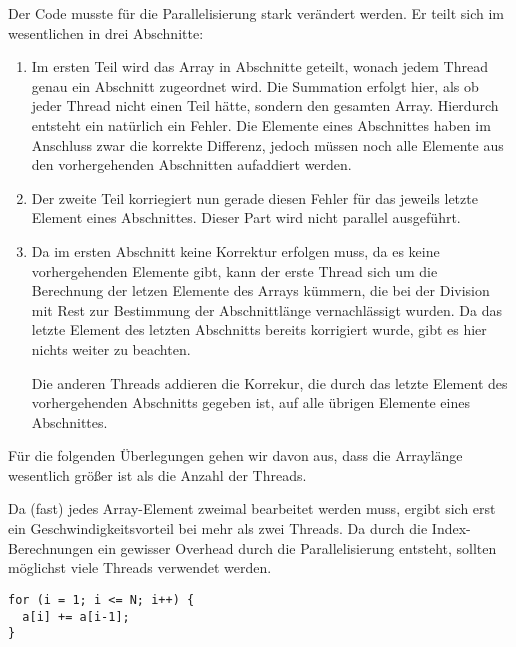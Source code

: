 Der Code musste für die Parallelisierung stark verändert werden. Er teilt sich
im wesentlichen in drei Abschnitte:
\begin{enumerate}
 \item Im ersten Teil wird das Array in Abschnitte geteilt, wonach jedem Thread
       genau ein Abschnitt zugeordnet wird. Die Summation erfolgt hier, als ob
       jeder Thread nicht einen Teil hätte, sondern den gesamten Array. Hierdurch
       entsteht ein natürlich ein Fehler. Die Elemente eines Abschnittes haben im
       Anschluss zwar die korrekte Differenz, jedoch müssen noch alle Elemente aus
       den vorhergehenden Abschnitten aufaddiert werden.
 \item Der zweite Teil korriegiert nun gerade diesen Fehler für das jeweils letzte
       Element eines Abschnittes. Dieser Part wird nicht parallel ausgeführt.
 \item Da im ersten Abschnitt keine Korrektur erfolgen muss, da es keine vorhergehenden
       Elemente gibt, kann der erste Thread sich um die Berechnung der letzen
       Elemente des Arrays kümmern, die bei der Division mit Rest zur Bestimmung
       der Abschnittlänge vernachlässigt wurden. Da das letzte Element des letzten
       Abschnitts bereits korrigiert wurde, gibt es hier nichts weiter zu beachten.

       Die anderen Threads addieren die Korrekur, die durch das letzte Element
       des vorhergehenden Abschnitts gegeben ist, auf alle übrigen Elemente eines
       Abschnittes.
\end{enumerate}

Für die folgenden Überlegungen gehen wir davon aus, dass die Arraylänge wesentlich
größer ist als die Anzahl der Threads.

Da (fast) jedes Array-Element zweimal bearbeitet werden muss, ergibt sich erst ein
Geschwindigkeitsvorteil bei mehr als zwei Threads. Da durch die Index-Berechnungen
ein gewisser Overhead durch die Parallelisierung entsteht, sollten möglichst viele
Threads verwendet werden.



\begin{lstlisting}[caption=Original-Code,label=lst:code3_orig]
for (i = 1; i <= N; i++) {
  a[i] += a[i-1];
}
\end{lstlisting}

